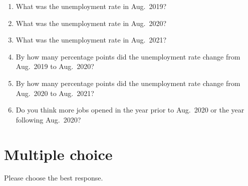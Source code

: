 \documentclass[
    letterpaper,paper=portrait,fleqn,
    DIV=16,fontsize=12pt,twoside=semi,
    parskip=full-,
    headings=standardclasses]
{scrartcl}
\begin{document}
\begin{enumerate}[resume]

\item What was the unemployment rate in Aug.~2019?

\vfill

\item What was the unemployment rate in Aug.~2020?

\vfill

\item What was the unemployment rate in Aug.~2021?

\vfill

\item By how many percentage points did the unemployment rate change from Aug.~2019 to Aug.~2020?

\vfill

\item By how many percentage points did the unemployment rate change from Aug.~2020 to Aug.~2021?

\vfill

\item Do you think more jobs opened in the year prior to Aug.~2020 or the year following Aug.~2020?

\vfill

\end{enumerate}

\vspace{-2\baselineskip}
\clearpage

\section{Multiple choice}

Please choose the best response.
\end{document}
